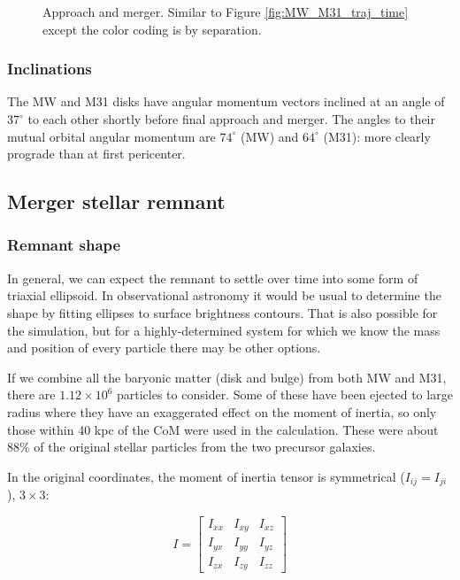 \documentclass[twocolumn]{aastex63}
\begin{document}
\begin{figure}[htb!]
	\caption{Approach and merger. Similar to Figure \ref{fig:MW_M31_traj_time} except the color coding is by separation.
		\label{fig:MW_M31_traj_sep}}
\end{figure}


\subsubsection{Inclinations}

The MW and M31 disks have angular momentum vectors inclined at an angle of $37^\circ$ to each other shortly before final approach and merger. The angles to their mutual orbital angular momentum are $74^\circ$ (MW) and $64^\circ$ (M31): more clearly prograde than at first pericenter.

\subsection{Merger stellar remnant}

\subsubsection{Remnant shape}

In general, we can expect the remnant to settle over time into some form of triaxial ellipsoid. In observational astronomy it would be usual to determine the shape by fitting ellipses to surface brightness contours. That is also possible for the simulation, but for a highly-determined system for which we know the mass and position of every particle there may be other options.

If we combine all the baryonic matter (disk and bulge) from both MW and M31, there are $1.12 \times 10^6$ particles to consider. Some of these have been ejected to large radius where they have an exaggerated effect on the moment of inertia, so only those within 40 kpc of the CoM were used in the calculation. These were about 88\% of the original stellar particles from the two precursor galaxies.

In the original coordinates, the moment of inertia tensor is symmetrical ($I_{ij} = I_{ji}$), $3 \times 3$:

\[ I = \begin{bmatrix}
			I_{xx} & I_{xy} & I_{xz}\\
			I_{yx} & I_{yy} & I_{yz}\\
			I_{zx} & I_{zy} & I_{zz} 
		\end{bmatrix} \]
		
\end{document}
